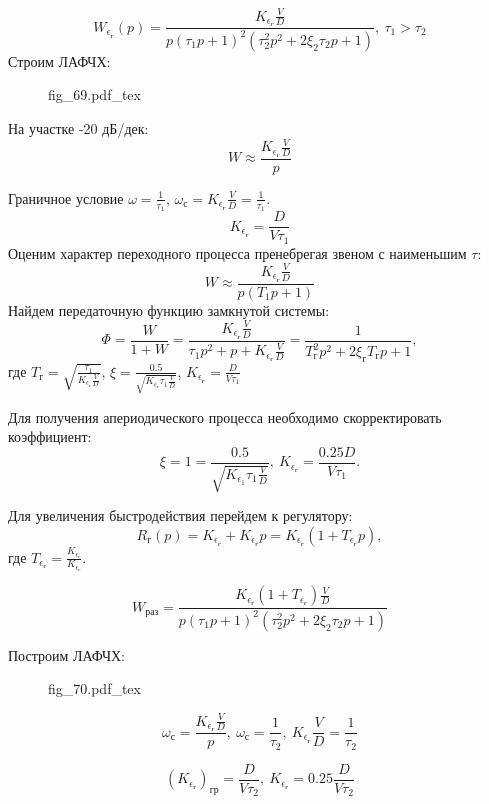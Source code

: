 \documentclass{article}
\newcommand{\incfig}[1]{
    {#1.pdf_tex}
}
\begin{document}
\[
    W_{\epsilon_\text{г}}(p)= \frac{K_{\epsilon_\text{г}}
    \frac{V}{D}}{p(\tau_{1}p + 1)^2 ( \tau_2^2 p^2 + 2 \xi_2 \tau_2 p + 1 )}, \
    \tau_1 > \tau_2
\]
Строим ЛАФЧХ:
\begin{figure}[H]
    \centering
    \incfig{fig_69}
    \label{fig:fig_69}
\end{figure}
На участке -20 дБ/дек:
\[
    W \approx \frac{K_{\epsilon_\text{г}} \frac{V}{D}}{p}
\]

Граничное условие $\omega = \frac{1}{\tau_1}$, $\omega_\text{с} =
K_{\epsilon_\text{г}} \frac{V}{D} = \frac{1}{\tau_1}$.
\[
    K_{\epsilon_\text{г}} = \frac{D}{V \tau_1}
\]
Оценим характер переходного процесса пренебрегая звеном с наименьшим $\tau$:
\[
    W \approx \frac{K_{\epsilon_\text{г}} \frac{V}{D}}{p (T_1 p + 1)}
\]
Найдем передаточную функцию замкнутой системы:
\[
    \Phi = \frac{W}{1 + W} = \frac{K_{\epsilon_\text{г}} \frac{V}{D}}{\tau_1
    p^2 + p + K_{\epsilon_\text{г}} \frac{V}{D}}= \frac{1}{ T_\text{г}^2 p^2 +
2 \xi_\text{г} T_\text{г} p + 1 },
\]
где $T_\text{г} = \sqrt{ \frac{\tau_1}{K_{\epsilon_\text{г}} \frac{V}{D}}}$,
$\xi = \frac{0.5}{\sqrt{K_{\epsilon_\text{г}} \tau_1 \frac{V}{D}}}$,
$K_{\epsilon_\text{г}} = \frac{D}{V \tau_1}$

Для получения апериодического процесса необходимо скорректировать коэффициент:
\[
    \xi = 1 = \frac{0.5}{\sqrt{K_{\epsilon_1} \tau_1 \frac{V}{D}}}, \
    K_{\epsilon_\text{г}} = \frac{ 0.25 D}{V \tau_1}.
\]


Для увеличения быстродействия перейдем к регулятору:
\[
    R_\text{г} (p) = K_{\epsilon_\text{г}} + K_{\dot{\epsilon}_\text{г}}p =
    K_{\epsilon_\text{г}}(1 + T_{\epsilon_\text{г}} p),
\]
где $T_{\epsilon_{\text{г}}} =
\frac{K_{\dot{\epsilon}_{\text{г}}}}{K_{\epsilon_\text{г}}}$.

\[
    W_\text{раз} = \frac{K_{\epsilon_\text{г}}(1 +  T_{\epsilon_\text{г}} )
    \frac{V}{D}}{p(\tau_{1}p + 1)^2 ( \tau_2^2 p^2 + 2 \xi_2 \tau_2 p + 1 )}
\]

Построим ЛАФЧХ:
\begin{figure}[H]
    \centering
    \incfig{fig_70}
    \label{fig:fig_70}
\end{figure}

\[
    \omega_\text{с}   = \frac{K_{\epsilon_\text{г}} \frac{V}{D}}{p}, \
    \omega_\text{с} = \frac{1}{\tau_2}, \ K_{\epsilon_\text{г}} \frac{V}{D} =
    \frac{1}{\tau_2}
\]

\[
    (K_{\epsilon_\text{г}})_\text{гр} = \frac{D}{V \tau_2}, \
    K_{\epsilon_\text{г}} = 0.25 \frac{D}{V \tau_2}
\]
\end{document}
